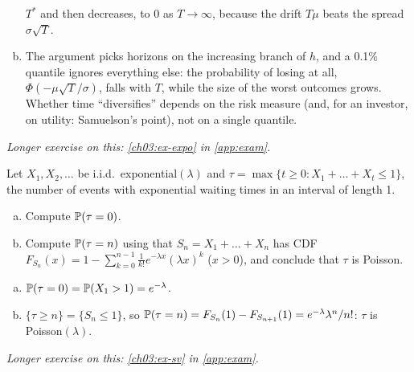 \begin{paracol}{2}
\begin{solution}[ch03:ex-timediv]
\begin{enumerate}[(a)]
        $T^*$ and then decreases, to 0 as $T\to\infty$, because the drift $T\mu$ beats the spread $\sigma\sqrt T$.
  \item The argument picks horizons on the increasing branch of $h$, and a 0.1\% quantile ignores everything else: the
        probability of losing at all, $\Phi(-\mu\sqrt T/\sigma)$, falls with $T$, while the size of the worst outcomes grows. Whether time
        ``diversifies'' depends on the risk measure (and, for an investor, on utility: Samuelson's point), not on a single quantile.
\end{enumerate}
\end{solution}

\noindent\emph{Longer exercise on this: \cref{ch03:ex-expo} in \cref{app:exam}.}

\begin{exercise}\label{ch03:ex-poissoncount}
Let $X_1,X_2,\dots$ be i.i.d.\ exponential$(\lambda)$ and $\tau=\max\{t\ge0:X_1+\dots+X_t\le1\}$, the number of events with
exponential waiting times in an interval of length 1.
\begin{enumerate}[(a)]
  \item Compute $\mathbb{P}(\tau=0)$.
  \item Compute $\mathbb{P}(\tau=n)$ using
      that $S_n=X_1+\dots+X_n$ has CDF $F_{S_n}(x)=1-\sum_{k=0}^{n-1}\frac1{k!}e^{-\lambda x}(\lambda x)^k$ ($x>0$), and conclude that
      $\tau$ is Poisson.
\end{enumerate}
\end{exercise}
\begin{solution}[ch03:ex-poissoncount]
\begin{enumerate}[(a)]
  \item $\mathbb{P}(\tau=0)=\mathbb{P}(X_1>1)=e^{-\lambda}$.
  \item $\{\tau\ge n\}=\{S_n\le1\}$, so $\mathbb{P}(\tau=n)=F_{S_n}(1)-F_{S_{n+1}}(1)=e^{-\lambda}\lambda^n/n!$: $\tau$ is Poisson$(\lambda)$.
\end{enumerate}
\end{solution}

\noindent\emph{Longer exercise on this: \cref{ch03:ex-sv} in \cref{app:exam}.}


\end{paracol}
